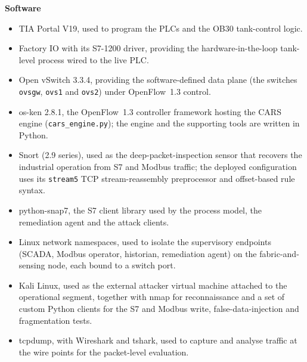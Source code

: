 \noindent\textbf{Software}
\begin{itemize}
\item TIA Portal V19, used to program the PLCs and the OB30 tank-control logic.
\item Factory IO with its S7-1200 driver, providing the hardware-in-the-loop tank-level process wired to the live PLC.
\item Open vSwitch 3.3.4, providing the software-defined data plane (the switches \texttt{ovsgw}, \texttt{ovs1} and \texttt{ovs2}) under OpenFlow~1.3 control.
\item os-ken 2.8.1, the OpenFlow~1.3 controller framework hosting the CARS engine (\texttt{cars\_engine.py}); the engine and the supporting tools are written in Python.
\item Snort (2.9 series), used as the deep-packet-inspection sensor that recovers the industrial operation from S7 and Modbus traffic; the deployed configuration uses its \texttt{stream5} TCP stream-reassembly preprocessor and offset-based rule syntax.
\item python-snap7, the S7 client library used by the process model, the remediation agent and the attack clients.
\item Linux network namespaces, used to isolate the supervisory endpoints (SCADA, Modbus operator, historian, remediation agent) on the fabric-and-sensing node, each bound to a switch port.
\item Kali Linux, used as the external attacker virtual machine attached to the operational segment, together with nmap for reconnaissance and a set of custom Python clients for the S7 and Modbus write, false-data-injection and fragmentation tests.
\item tcpdump, with Wireshark and tshark, used to capture and analyse traffic at the wire points for the packet-level evaluation.
\end{itemize}
